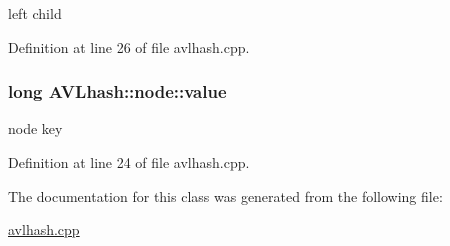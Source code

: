left child 



Definition at line 26 of file avlhash.\-cpp.

\hypertarget{class_a_v_lhash_1_1node_ae9a61d69f8a794835900ec366b8e71fd}{
\subsubsection[{value}]{\setlength{\rightskip}{0pt plus 5cm}long A\-V\-Lhash\-::node\-::value}}\label{class_a_v_lhash_1_1node_ae9a61d69f8a794835900ec366b8e71fd}


node key 



Definition at line 24 of file avlhash.\-cpp.



The documentation for this class was generated from the following file\-:\begin{DoxyCompactItemize}
\item 
\hyperlink{avlhash_8cpp}{avlhash.\-cpp}\end{DoxyCompactItemize}

